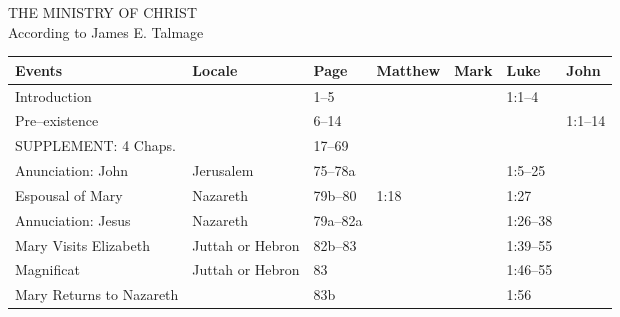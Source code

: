 

\clearpage
\renewcommand*{\familydefault}{\sfdefault}
\begin{center}
    {\Large THE MINISTRY OF CHRIST} \\
    According to James E. Talmage
\end{center}
\vspace{-2ex}
\begin{longtable}[h]{l@{\hspace{0.5em}}l@{\hspace{0.5em}}l@{\hspace{0.5em}}BBBB}
    \toprule
    {Events} & {Locale} & Page & Matthew & Mark & Luke & John \\
    \midrule
\endhead
    \bottomrule
\endfoot
    \bottomrule
\endlastfoot
Introduction                               &                     & 1--5               &                   &                    & 1:1--4                & \\
Pre--existence                             &                     & 6--14              &                   &                    &                       & 1:1--14 \\
SUPPLEMENT: 4 Chaps.                       &                     & 17--69             &                   &                    &                       & \\
Anunciation: John                          & Jerusalem           & 75--78a            &                   &                    & 1:5--25               & \\
Espousal of Mary                           & Nazareth            & 79b--80            & 1:18              &                    & 1:27                  & \\
Annuciation: Jesus                         & Nazareth            & 79a--82a           &                   &                    & 1:26--38              & \\
Mary Visits Elizabeth                      & Juttah or Hebron    & 82b--83            &                   &                    & 1:39--55              & \\
\quad Magnificat                           & Juttah or Hebron    & 83                 &                   &                    & 1:46--55              & \\
Mary Returns to Nazareth                   &                     & 83b                &                   &                    & 1:56                  & \\

\end{longtable}
